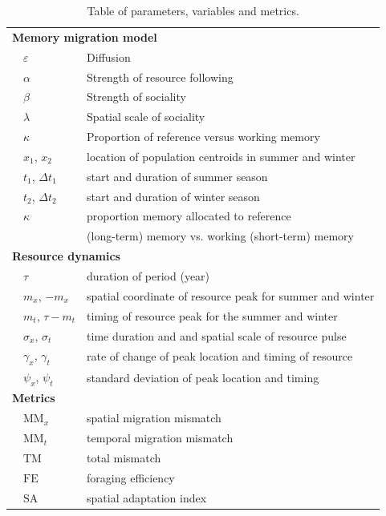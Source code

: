 \documentclass[utf8]{frontiersSCNS} %
\begin{document}
	\begin{table}[b!]
		\caption{\label{table_definitions} Table of parameters, variables and metrics.}
		
		\centering
		\begin{tabular}{ll|l}
			\hline\hline
			\multicolumn{3}{l}{\textbf{Memory migration model}}\\ 
			& $\varepsilon$ & Diffusion \\ 
			& $\alpha$ & Strength of resource following \\ 
			& $\beta$ & Strength of sociality \\ 
			& $\lambda$ & Spatial scale of sociality \\ 
			& $\kappa$ & Proportion of reference versus working memory \\ 
			& $x_1$, $x_2$ & location of population centroids in summer and winter \\ 
			& $t_1$, $\Delta t_1$ & start and duration of summer season \\ 
			& $t_2$, $\Delta t_2$ & start and duration of winter season \\ 
			& $\kappa$ & proportion memory allocated to reference \\
			&& (long-term) memory vs. working (short-term) memory \\ 
			\multicolumn{3}{l}{\textbf{Resource dynamics}} \\ 
			& $\tau$ & duration of period (year) \\ 
			& $m_x$, $-m_x$ & spatial coordinate of resource peak for summer and winter \\ 
			& $m_t$, $\tau - m_t$ & timing of resource peak for the summer and winter \\ 
			& $\sigma_x$, $\sigma_t$ & time duration and and spatial scale of resource pulse \\ 
			& $\gamma_x$, $\gamma_t$ & rate of change of peak location and timing of resource \\ 
			& $\psi_x$, $\psi_t$ & standard deviation of peak location and timing \\ 
			\multicolumn{3}{l}{\textbf{Metrics}}\\ 
			& $\text{MM}_x$ & spatial migration mismatch \\ 
			& $\text{MM}_t$ & temporal migration mismatch \\ 
			& $\text{TM}$ & total mismatch \\ 
			& $\text{FE}$ & foraging efficiency \\ 
			& $\text{SA}$ & spatial adaptation index \\ 
			\hline\hline
		\end{tabular}
	\end{table}
	
\end{document}
